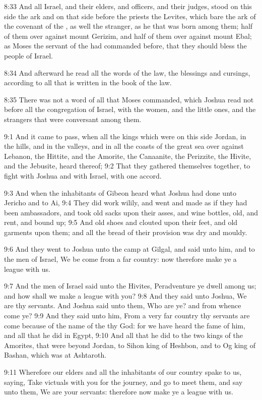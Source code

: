 8:33 And all Israel, and their elders, and officers, and their judges,
stood on this side the ark and on that side before the priests the
Levites, which bare the ark of the covenant of the \LORD, as well the
stranger, as he that was born among them; half of them over against
mount Gerizim, and half of them over against mount Ebal; as Moses the
servant of the \LORD had commanded before, that they should bless the
people of Israel.

8:34 And afterward he read all the words of the law, the blessings and
cursings, according to all that is written in the book of the law.

8:35 There was not a word of all that Moses commanded, which Joshua
read not before all the congregation of Israel, with the women, and
the little ones, and the strangers that were conversant among them.

9:1 And it came to pass, when all the kings which were on this side
Jordan, in the hills, and in the valleys, and in all the coasts of the
great sea over against Lebanon, the Hittite, and the Amorite, the
Canaanite, the Perizzite, the Hivite, and the Jebusite, heard thereof;
9:2 That they gathered themselves together, to fight with Joshua and
with Israel, with one accord.

9:3 And when the inhabitants of Gibeon heard what Joshua had done unto
Jericho and to Ai, 9:4 They did work wilily, and went and made as if
they had been ambassadors, and took old sacks upon their asses, and
wine bottles, old, and rent, and bound up; 9:5 And old shoes and
clouted upon their feet, and old garments upon them; and all the bread
of their provision was dry and mouldy.

9:6 And they went to Joshua unto the camp at Gilgal, and said unto
him, and to the men of Israel, We be come from a far country: now
therefore make ye a league with us.

9:7 And the men of Israel said unto the Hivites, Peradventure ye dwell
among us; and how shall we make a league with you?  9:8 And they said
unto Joshua, We are thy servants. And Joshua said unto them, Who are
ye? and from whence come ye?  9:9 And they said unto him, From a very
far country thy servants are come because of the name of the \LORD thy
God: for we have heard the fame of him, and all that he did in Egypt,
9:10 And all that he did to the two kings of the Amorites, that were
beyond Jordan, to Sihon king of Heshbon, and to Og king of Bashan,
which was at Ashtaroth.

9:11 Wherefore our elders and all the inhabitants of our country spake
to us, saying, Take victuals with you for the journey, and go to meet
them, and say unto them, We are your servants: therefore now make ye a
league with us.

